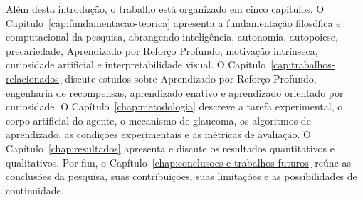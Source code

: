 Além desta introdução, o trabalho está organizado em cinco capítulos. O Capítulo~\ref{cap:fundamentacao-teorica} apresenta a fundamentação filosófica e computacional da pesquisa, abrangendo inteligência, autonomia, autopoiese, precariedade, Aprendizado por Reforço Profundo, motivação intrínseca, curiosidade artificial e interpretabilidade visual. O Capítulo~\ref{cap:trabalhos-relacionados} discute estudos sobre Aprendizado por Reforço Profundo, engenharia de recompensas, aprendizado enativo e aprendizado orientado por curiosidade. O Capítulo~\ref{chap:metodologia} descreve a tarefa experimental, o corpo artificial do agente, o mecanismo de glaucoma, os algoritmos de aprendizado, as condições experimentais e as métricas de avaliação. O Capítulo~\ref{chap:resultados} apresenta e discute os resultados quantitativos e qualitativos. Por fim, o Capítulo~\ref{chap:conclusoes-e-trabalhos-futuros} reúne as conclusões da pesquisa, suas contribuições, suas limitações e as possibilidades de continuidade.
